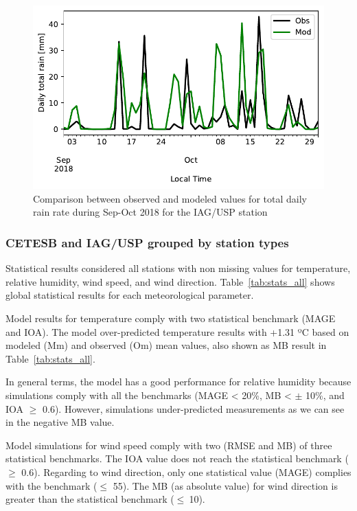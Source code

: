 \begin{figure}[!hbt]
	\centering
  \includegraphics[width=.8\textwidth]{fig/iag_daily_rain}
  \caption{Comparison between observed and modeled values for total daily rain rate during Sep-Oct 2018 for the IAG/USP station}
  \label{fig:iag_daily_rain}
\end{figure}




\subsubsection{CETESB and IAG/USP grouped by station types}
Statistical results considered all stations with non missing values for temperature, relative humidity, wind speed, and wind direction.
Table~\ref{tab:stats_all} shows global statistical results for each meteorological parameter.



Model results for temperature comply with two statistical benchmark (MAGE and IOA).
The model over-predicted temperature results with +1.31 ºC based on modeled (Mm) and observed (Om) mean values, also shown as MB result in Table~\ref{tab:stats_all}.

In general terms, the model has a good performance for relative humidity because simulations comply with all the benchmarks (MAGE < 20\%, MB < $\pm$ 10\%, and IOA $\geq$ 0.6).
However, simulations under-predicted measurements as we can see in the negative MB value.

Model simulations for wind speed comply with two (RMSE and MB) of three statistical benchmarks.
The IOA value does not reach the statistical benchmark ($\geq$ 0.6).
Regarding to wind direction, only one statistical value (MAGE) complies with the benchmark ($\leq$ 55).
The MB (as absolute value) for wind direction is greater than the statistical benchmark ($\leq~$10).

